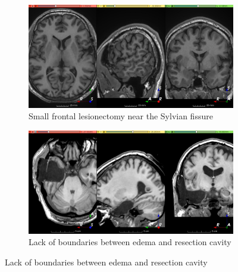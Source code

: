\begin{figure}
  \bigskip

  \begin{subfigure}{0.49\textwidth}
    \centering
    \includegraphics[width=\linewidth]{figures/hard_3}
    \caption{Small frontal lesionectomy near the Sylvian fissure}
    \label{fig:hard_sub_3}
  \end{subfigure}
  \hfill
  \begin{subfigure}{0.49\textwidth}
    \centering
    \includegraphics[width=\linewidth]{figures/hard_4}
    \caption{Lack of boundaries between edema and resection cavity}
    \label{fig:hard_sub_4}
  \end{subfigure}

  \bigskip


\end{figure}
